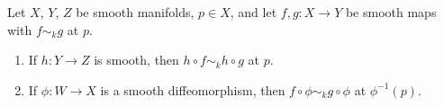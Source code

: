 Let $X$, $Y$, $Z$ be smooth manifolds, $p \in X$, and let $f, g: X \to Y$ be smooth maps with $f \sim_k g$ at $p$.

\begin{enumerate}
\item If $h: Y \to Z$ is smooth, then $h \circ f \sim_k h \circ g$ at $p$.
\item If $\phi: W \to X$ is a smooth diffeomorphism, then $f \circ \phi \sim_k g \circ \phi$ at $\phi^{-1}(p)$.
\end{enumerate}
